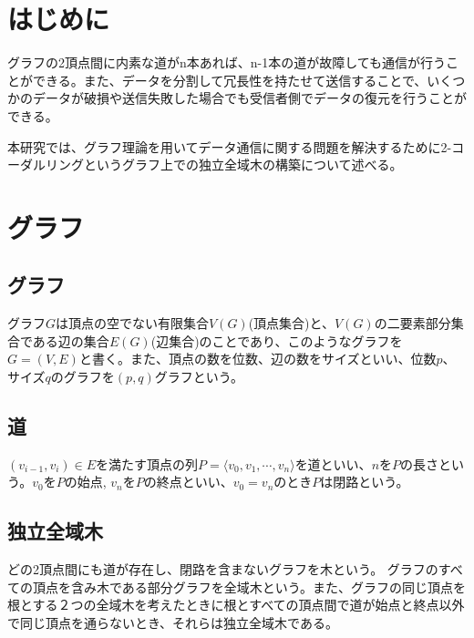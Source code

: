 \documentclass[dvipdfmx, twocolumn, 11pt]{jsarticle}
\begin{document}
 


\section{はじめに}
    グラフの2頂点間に内素な道がn本あれば、n-1本の道が故障しても通信が行うことができる。また、データを分割して冗長性を持たせて送信することで、いくつかのデータが破損や送信失敗した場合でも受信者側でデータの復元を行うことができる。\par
    本研究では、グラフ理論を用いてデータ通信に関する問題を解決するために2-コーダルリングというグラフ上での独立全域木の構築について述べる。

\section{グラフ}
    \subsection{グラフ}
        グラフ$G$は頂点の空でない有限集合$V(G)$(頂点集合)と、$V(G)$の二要素部分集合である辺の集合$E(G)$(辺集合)のことであり、このようなグラフを$G=(V,E)$と書く。また、頂点の数を位数、辺の数をサイズといい、位数$p$、サイズ$q$のグラフを$(p,q)$グラフという。

    \subsection{道}
        $(v_{i-1}, v_i) \in E$を満たす頂点の列$P = \langle v_0, v_1, \cdots, v_n \rangle$を道といい、$n$を$P$の長さという。$v_0$を$P$の始点, $v_n$を$P$の終点といい、$v_0 = v_n$のとき$P$は閉路という。

    \subsection{独立全域木}
        どの2頂点間にも道が存在し、閉路を含まないグラフを木という。
        グラフのすべての頂点を含み木である部分グラフを全域木という。また、グラフの同じ頂点を根とする２つの全域木を考えたときに根とすべての頂点間で道が始点と終点以外で同じ頂点を通らないとき、それらは独立全域木である。
\end{document}

